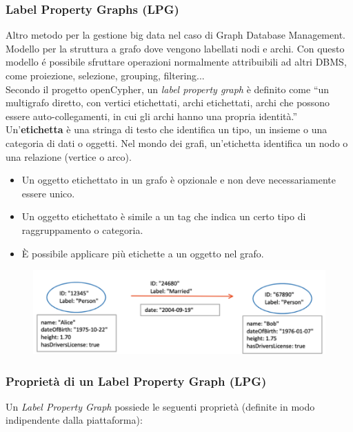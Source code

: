 \subsubsection*{Label Property Graphs (LPG)}
Altro metodo per la gestione big data nel caso di Graph Database Management. Modello per la struttura a grafo dove vengono labellati nodi e archi. Con questo modello é possibile sfruttare operazioni normalmente attribuibili ad altri DBMS, come proiezione, selezione, grouping, filtering...
\\
Secondo il progetto openCypher, un \textit{label property graph} è definito come “un multigrafo diretto, con vertici etichettati, archi etichettati, archi che possono essere auto-collegamenti, in cui gli archi hanno una propria identità.” Un'\textbf{etichetta} è una stringa di testo che identifica un tipo, un insieme o una categoria di dati o oggetti. Nel mondo dei grafi, un'etichetta identifica un nodo o una relazione (vertice o arco).
\begin{itemize}
    \item Un oggetto etichettato in un grafo è opzionale e non deve necessariamente essere unico.
    \item Un oggetto etichettato è simile a un tag che indica un certo tipo di raggruppamento o categoria.
    \item È possibile applicare più etichette a un oggetto nel grafo.
\end{itemize}

\begin{figure}[th]
    \centering
    \includegraphics[width=0.65\linewidth]{GraphDataEngineering//img/lpg.png}
\end{figure}

\subsubsection*{Proprietà di un Label Property Graph (LPG)}

Un \textit{Label Property Graph} possiede le seguenti proprietà (definite in modo indipendente dalla piattaforma):

